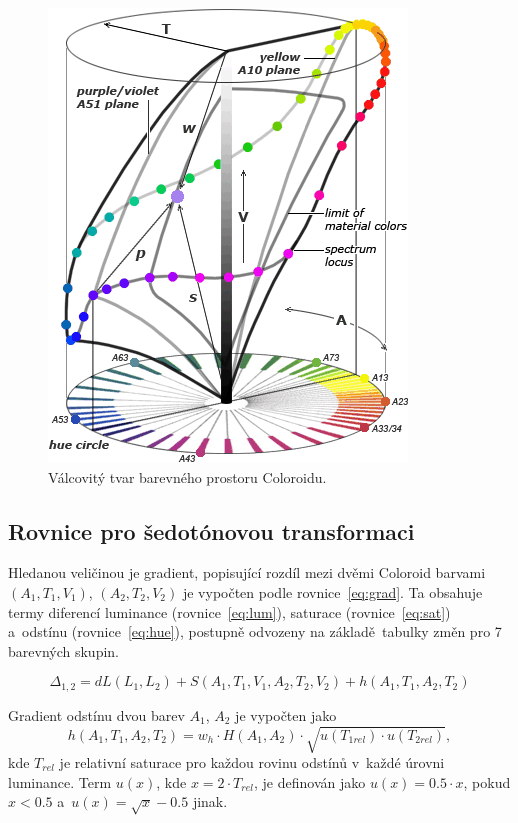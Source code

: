 \documentclass[11pt,a4paper,oneside]{article}
\begin{document}
	\begin{figure}[htb]
		\centering
		\includegraphics[scale=0.5]{fig/Coloroid.png}
		\caption{Válcovitý tvar barevného prostoru Coloroidu.} 
		\label{fig:coloroid}
	\end{figure}

	\subsection{Rovnice pro šedotónovou transformaci}
	Hledanou veličinou je gradient, popisující rozdíl mezi dvěmi Coloroid
	barvami $(A_1, T_1, V_1)$, $(A_2, T_2, V_2)$ je vypočten podle
	rovnice~\eqref{eq:grad}. Ta obsahuje termy diferencí luminance
	(rovnice~\eqref{eq:lum}), saturace (rovnice~\eqref{eq:sat}) a~odstínu
	(rovnice~\eqref{eq:hue}), postupně odvozeny na základě~tabulky změn
	pro 7 barevných skupin.

	\begin{equation}
		\Delta_{1, 2} = dL(L_1, L_2) + S(A_1, T_1, V_1, A_2, T_2, V_2) + h(A_1, T_1, A_2, T_2)
		\label{eq:grad}
	\end{equation}

	Gradient odstínu dvou barev $A_1$, $A_2$ je vypočten jako
	\begin{equation}
		h(A_1, T_1, A_2, T_2) = w_h \cdot H(A_1, A_2) \cdot \sqrt{u(T_{1rel}) \cdot u(T_{2rel})},
		\label{eq:hue}
	\end{equation}
	kde $T_{rel}$ je relativní saturace pro každou rovinu odstínů v~každé úrovni luminance.
	Term $u(x)$, kde $x = 2 \cdot T_{rel}$, je definován jako $u(x) = 0.5 \cdot x$, pokud $x < 0.5$
	a~$u(x) = \sqrt{x} - 0.5$ jinak.
\end{document}
